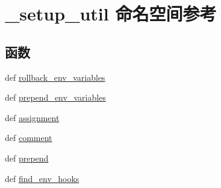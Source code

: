 \hypertarget{namespace__setup__util}{\section{\-\_\-setup\-\_\-util 命名空间参考}
\label{namespace__setup__util}
}
\subsection*{函数}
\begin{DoxyCompactItemize}
\item 
def \hyperlink{namespace__setup__util_a5b1728beb6e19ccf126bf9e02de6083e}{rollback\-\_\-env\-\_\-variables}
\item 
def \hyperlink{namespace__setup__util_a44654f701304ecab7e37798abf014d1a}{prepend\-\_\-env\-\_\-variables}
\item 
def \hyperlink{namespace__setup__util_a7983d4ea2ecdeaf54e133950d8a76e77}{assignment}
\item 
def \hyperlink{namespace__setup__util_a9d73115db9efca5c20b575f96b9eb065}{comment}
\item 
def \hyperlink{namespace__setup__util_a4ced140c2841c9a3e692bf39d98aa9eb}{prepend}
\item 
def \hyperlink{namespace__setup__util_aad4a41589ebc32e81406c63db26e721a}{find\-\_\-env\-\_\-hooks}
\end{DoxyCompactItemize}
